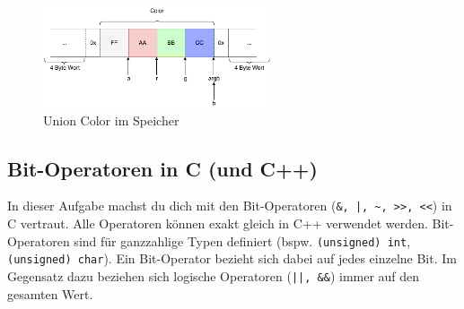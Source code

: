 \begin{figure}[!htb]
	\centering
	\includegraphics[width=0.6\textwidth]{./05_c/figures/Color_Channels.pdf}
	\caption{Union Color im Speicher}
	\label{fig:color_channels}
\end{figure} 



\subsection{Bit-Operatoren in C (und C++)}
\label{task:bitops}

In dieser Aufgabe machst du dich mit den Bit-Operatoren (\lstinline{&, |, ~, >>, <<}) in C vertraut.
Alle Operatoren können exakt gleich in C++ verwendet werden.
Bit-Operatoren sind für ganzzahlige Typen definiert (bspw. \lstinline|(unsigned) int|, \lstinline|(unsigned) char|).
Ein Bit-Operator bezieht sich dabei auf jedes einzelne Bit.
Im Gegensatz dazu beziehen sich logische Operatoren (\lstinline{||, &&}) immer auf den gesamten Wert.

